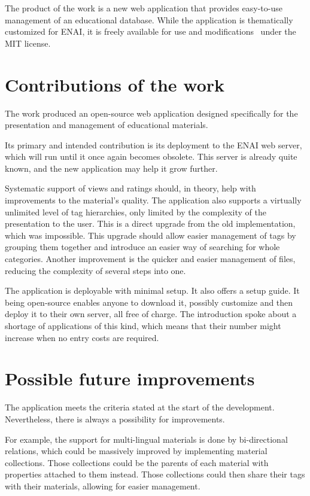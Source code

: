 \documentclass[
  digital,     %
  oneside,     %
  nosansbold,  %
  colorbold, %
  lof,         %
  lot,         %
]{fithesis4}
\begin{document}
The product of the work is a new web application that provides easy-to-use management of an
educational database. While the application is thematically customized for ENAI, it is freely available
for use and modifications~\cite{repository} under the MIT license.

\section{Contributions of the work}

The work produced an open-source web application designed specifically for the presentation and
management of educational materials. 

Its primary and intended contribution is its deployment to the ENAI web server, which will run until it
once again becomes obsolete. This server is already quite known, and the new application may help it
grow further.

Systematic support of views and ratings should, in theory, help with improvements to the material's
quality. The application also supports a virtually unlimited level of tag hierarchies, only limited by the
complexity of the presentation to the user. This is a direct upgrade from the old implementation,
which was impossible. This upgrade should allow easier management of tags by grouping them
together and introduce an easier way of searching for whole categories. Another improvement is the
quicker and easier management of files, reducing the complexity of several steps into one.

The application is deployable with minimal setup. It also offers a setup guide. It being open-source
enables anyone to download it, possibly customize and then deploy it to their own server, all free of
charge. The introduction spoke about a shortage of applications of this kind, which means that their
number might increase when no entry costs are required.

\section{Possible future improvements}

The application meets the criteria stated at the start of the development. Nevertheless, there is
always a possibility for improvements.

For example, the support for multi-lingual materials is done by bi-directional relations, which could be
massively improved by implementing material collections. Those collections could be the parents of
each material with properties attached to them instead. Those collections could then share their tags
with their materials, allowing for easier management.
\end{document}
